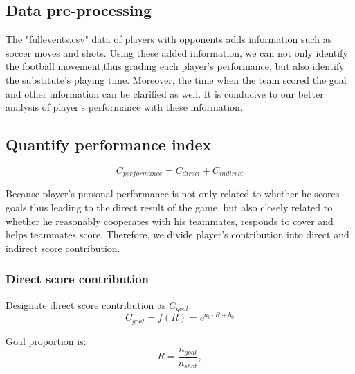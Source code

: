 \documentclass{mcmthesis}
\begin{document}
\subsection{Data pre-processing}%
The "fullevents.csv" data of players with opponents adds information such as soccer moves and shots. Using these added information, we can not only identify the football movement,thus grading each player's performance, but also identify the substitute's playing time. Moreover, the time when the team scored the goal and other information can be clarified as well. It is conducive to our better analysis of player's performance with these information.

\subsection{Quantify performance index}
\begin{equation}
C_{performance}= C_{direct}+ C_{indirect}
\end{equation}


Because player's personal performance is not only related to whether he scores goals thus leading to the direct result of the game, but also closely related to whether he reasonably cooperates with his teammates, responds to cover and helps teammates score. Therefore, we divide player's contribution into direct and indirect score contribution.


\subsubsection{Direct score contribution }
Designate direct score contribution as $C_{goal}$.
\begin{equation}
C_{goal}=f(R)=e^{a_{0}\cdot R+b_{0}}
\end{equation} 

Goal proportion is:
\begin{equation}
R =\frac{n_{goal} }{n_{shot}},
\end{equation}
\end{document}
